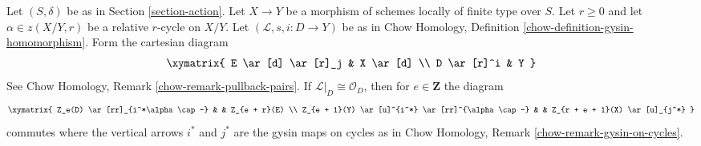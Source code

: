 \begin{lemma}
\label{lemma-action-gysin}
Let $(S, \delta)$ be as in Section \ref{section-action}.
Let $X \to Y$ be a morphism of schemes
locally of finite type over $S$. Let $r \geq 0$ and let
$\alpha \in z(X/Y, r)$ be a relative $r$-cycle on $X/Y$.
Let $(\mathcal{L}, s, i : D \to Y)$ be as in
Chow Homology, Definition \ref{chow-definition-gysin-homomorphism}.
Form the cartesian diagram
$$
\xymatrix{
E \ar[d] \ar[r]_j & X \ar[d] \\
D \ar[r]^i & Y
}
$$
See Chow Homology, Remark \ref{chow-remark-pullback-pairs}.
If $\mathcal{L}|_D \cong \mathcal{O}_D$, then for $e \in \mathbf{Z}$
the diagram
$$
\xymatrix{
Z_e(D) \ar[rr]_{i^*\alpha \cap -} & &
Z_{e + r}(E) \\
Z_{e + 1}(Y) \ar[u]^{i^*} \ar[rr]^{\alpha \cap -} & &
Z_{r + e + 1}(X) \ar[u]_{j^*}
}
$$
commutes where the vertical arrows $i^*$ and $j^*$ are the
gysin maps on cycles as in
Chow Homology, Remark \ref{chow-remark-gysin-on-cycles}.
\end{lemma}

